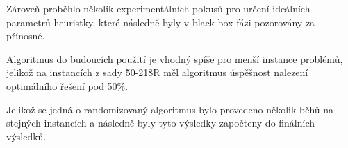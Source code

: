 \documentclass[twoside,twocolumn]{article}
\begin{document}
    Zároveň proběhlo několik experimentálních pokusů pro určení ideálních parametrů heuristky, které následně byly v black-box
    fázi pozorovány za přínosné.

    Algoritmus do budoucích použití je vhodný spíše pro menší instance problémů, jelikož na instancích z sady 50-218R
    měl algoritmus úspěšnost nalezení optimálního řešení pod 50\%.

    Jelikož se jedná o randomizovaný algoritmus bylo provedeno několik běhů na stejných instancích a následně byly tyto výsledky
    započteny do finálních výsledků.



    
    

%
%

\end{document}
